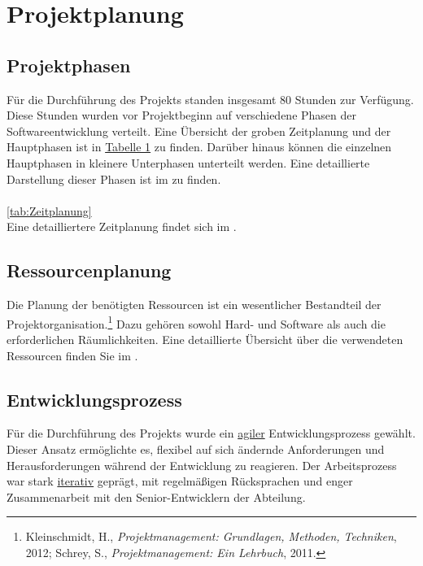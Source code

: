 
\section{Projektplanung} 
\label{sec:Projektplanung}

\subsection{Projektphasen}
\label{sec:Projektphasen}

Für die Durchführung des Projekts standen insgesamt 80 Stunden zur Verfügung. Diese Stunden wurden vor Projektbeginn auf verschiedene Phasen der Softwareentwicklung verteilt. Eine Übersicht der groben Zeitplanung und der Hauptphasen ist in
\hyperref[tab:Zeitplanung]{\textcolor{AOBlau}{Tabelle 1}} zu finden. Darüber hinaus können die einzelnen Hauptphasen in kleinere Unterphasen unterteilt werden. Eine detaillierte Darstellung dieser Phasen ist im  zu finden.

\paragraph{}
\ref{tab:Zeitplanung}
\\
Eine detailliertere Zeitplanung findet sich im .

\subsection{Ressourcenplanung}
\label{sec:Ressourcenplanung}

Die Planung der benötigten Ressourcen ist ein wesentlicher Bestandteil der Projektorganisation.\footnote{Kleinschmidt, H., \textit{Projektmanagement: Grundlagen, Methoden, Techniken}, 2012; Schrey, S., \textit{Projektmanagement: Ein Lehrbuch}, 2011.} Dazu gehören sowohl Hard- und Software als auch die erforderlichen Räumlichkeiten. Eine detaillierte Übersicht über die verwendeten Ressourcen finden Sie im . 

\subsection{Entwicklungsprozess}
\label{sec:Entwicklungsprozess}

Für die Durchführung des Projekts wurde ein \hyperlink{agil}{\textcolor{AOBlau}{agiler}} Entwicklungsprozess gewählt. Dieser Ansatz ermöglichte es, flexibel auf sich ändernde Anforderungen und Herausforderungen während der Entwicklung zu reagieren. Der Arbeitsprozess war stark \hyperlink{iterativ}{\textcolor{AOBlau}{iterativ}} geprägt, mit regelmäßigen Rücksprachen und enger Zusammenarbeit mit den Senior-Entwicklern der Abteilung.

